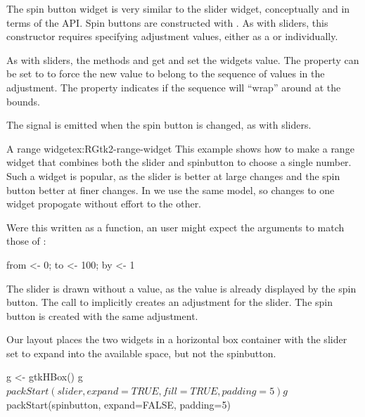 The spin button widget is very similar to the slider widget,
conceptually and in terms of the \GTK\/ API. Spin buttons are
constructed with . As with sliders, this
constructor requires specifying adjustment values, either as a
 or individually. 

As with sliders, the methods  and
 get and set the widgets
value. The property  can be set to  to
force the new value to belong to the sequence of values in the
adjustment. The  property indicates if the sequence will
``wrap'' around at the bounds.

The  signal is emitted when the spin button is
changed, as with sliders.

\begin{example}{A range widget}{ex:RGtk2-range-widget}
This example shows how to make a range widget that combines both the
slider and spinbutton to choose a single number. Such a widget is
popular, as the slider is better at large changes and the spin button
better at finer changes. In \GTK\/ we use the same
 model, so changes to one widget propogate
without effort to the other.


Were this written as a function, an \R\/ user might expect the
arguments to match those of :
\begin{Schunk}
\begin{Sinput}
 from <- 0; to <- 100; by <- 1
\end{Sinput}
\end{Schunk}

The slider is drawn without a value, as the value is already displayed
by the spin button. The call to  implicitly
creates an adjustment for the slider. The spin button is created with
the same adjustment.
\begin{Schunk}
\end{Schunk}
%
Our layout places the two widgets in a horizontal box container with
the slider set to expand into the available space, but not the
spinbutton.
\begin{Schunk}
\begin{Sinput}
 g <- gtkHBox()
 g$packStart(slider, expand=TRUE, fill=TRUE, padding=5)
 g$packStart(spinbutton, expand=FALSE, padding=5)
\end{Sinput}
\end{Schunk}


\end{example}


